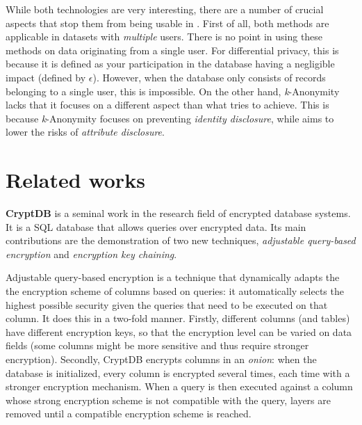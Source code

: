 
While both technologies are very interesting, there are a number of crucial aspects that stop them from being usable in \middleware{}. First of all, both methods are applicable in datasets with \textit{multiple} users. There is no point in using these methods on data originating from a single user. For differential privacy, this is because it is defined as your participation in the database having a negligible impact (defined by $\epsilon$). However, when the database only consists of records belonging to a single user, this is impossible. On the other hand, \textit{k}-Anonymity lacks that it focuses on a different aspect than what \middleware{} tries to achieve. This is because \textit{k}-Anonymity focuses on preventing \textit{identity disclosure}, while \middleware{} aims to lower the risks of \textit{attribute disclosure}. 

\section{Related works}
\noindent \textbf{CryptDB} \citep{cryptdb} is a seminal work in the research field of encrypted database systems. It is a SQL database that allows queries over encrypted data. Its main contributions are the demonstration of two new techniques, \textit{adjustable query-based encryption} and \textit{encryption key chaining}. 

Adjustable query-based encryption is a technique that dynamically adapts the the encryption scheme of columns based on queries: it automatically selects the highest possible security given the queries that need to be executed on that column. It does this in a two-fold manner. Firstly, different columns (and tables) have different encryption keys, so that the encryption level can be varied on data fields (some columns might be more sensitive and thus require stronger encryption). Secondly, CryptDB encrypts columns in an \textit{onion}: when the database is initialized, every column is encrypted several times, each time with a stronger encryption mechanism. When a query is then executed against a column whose strong encryption scheme is not compatible with the query, layers are removed until a compatible encryption scheme is reached. 


